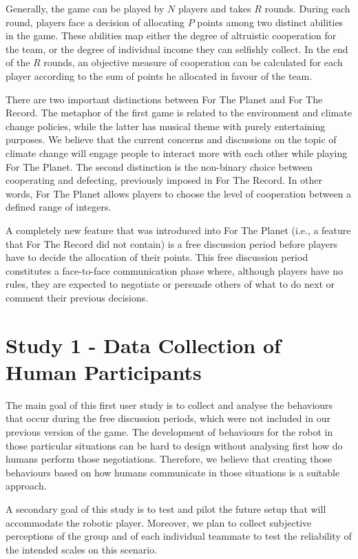 Generally, the game can be played by $N$ players and takes $R$ rounds. During each round, players face a decision of allocating $P$ points among two distinct abilities in the game. These abilities map either the degree of altruistic cooperation for the team, or the degree of individual income they can selfishly collect. In the end of the $R$ rounds, an objective measure of cooperation can be calculated for each player according to the sum of points he allocated in favour of the team.

There are two important distinctions between For The Planet and For The Record. The metaphor of the first game is related to the environment and climate change policies, while the latter has musical theme with purely entertaining purposes. We believe that the current concerns and discussions on the topic of climate change will engage people to interact more with each other while playing For The Planet. The second distinction is the non-binary choice between cooperating and defecting, previously imposed in For The Record. In other words, For The Planet allows players to choose the level of cooperation between a defined range of integers.

A completely new feature that was introduced into For The Planet (i.e., a feature that For The Record did not contain) is a free discussion period before players have to decide the allocation of their points. This free discussion period constitutes a face-to-face communication phase where, although players have no rules, they are expected to negotiate or persuade others of what to do next or comment their previous decisions. 

\section{Study 1 - Data Collection of Human Participants}
\label{sec:fw-study1}
The main goal of this first user study is to collect and analyse the behaviours that occur during the free discussion periods, which were not 
included in our previous version of the game. The development of behaviours for the robot in those particular situations can be hard to design without analysing first how do humans perform those negotiations. Therefore, we believe that creating those behaviours based on how humans communicate in those situations is a suitable approach.

A secondary goal of this study is to test and pilot the future setup that will accommodate the robotic player. Moreover, we plan to collect subjective perceptions of the group and of each individual teammate to test the reliability of the intended scales on this scenario.

